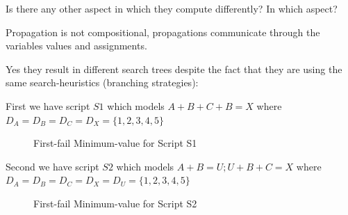 \documentclass[a4paper, 11pt]{article}
\begin{document}
Is there any other aspect in which they compute differently? In which aspect?

Propagation is not compositional, propagations communicate through the variables values and assignments. 

Yes they result in different search trees despite the fact that they are using the same search-heuristics (branching strategies):

First we have script $S1$ which models $A+B+C+B = X$ where $D_A = D_B = D_C = D_X = \{1,2,3,4,5\}$
\begin{figure}[H]
  \begin{center}
    \caption{First-fail Minimum-value for Script S1}
    \label{fig:ffvms1}
  \end{center}
\end{figure}

Second we have script $S2$ which models $A+B = U; U+B+C = X$ where $D_A = D_B = D_C = D_X = D_U = \{1,2,3,4,5\}$
\begin{figure}[H]
  \begin{center}
    \caption{First-fail Minimum-value for Script S2}
    \label{fig:ffvms2}
  \end{center}
\end{figure}
\end{document}
